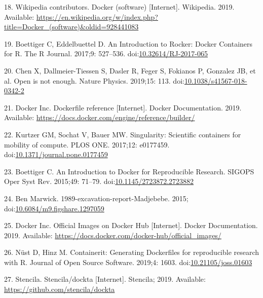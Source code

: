 \documentclass[10pt,letterpaper]{article}
\begin{document}
\leavevmode\hypertarget{ref-wikipedia_contributors_docker_2019}{}%
18. Wikipedia contributors. Docker (software) {[}Internet{]}. Wikipedia.
2019. Available:
\url{https://en.wikipedia.org/w/index.php?title=Docker_(software)\&oldid=928441083}

\leavevmode\hypertarget{ref-boettiger_introduction_2017}{}%
19. Boettiger C, Eddelbuettel D. An Introduction to Rocker: Docker
Containers for R. The R Journal. 2017;9: 527--536.
doi:\href{https://doi.org/10.32614/RJ-2017-065}{10.32614/RJ-2017-065}

\leavevmode\hypertarget{ref-chen_open_2019}{}%
20. Chen X, Dallmeier-Tiessen S, Dasler R, Feger S, Fokianos P, Gonzalez
JB, et al. Open is not enough. Nature Physics. 2019;15: 113.
doi:\href{https://doi.org/10.1038/s41567-018-0342-2}{10.1038/s41567-018-0342-2}

\leavevmode\hypertarget{ref-docker_inc_dockerfile_2019}{}%
21. Docker Inc. Dockerfile reference {[}Internet{]}. Docker
Documentation. 2019. Available:
\url{https://docs.docker.com/engine/reference/builder/}

\leavevmode\hypertarget{ref-kurtzer_singularity_2017}{}%
22. Kurtzer GM, Sochat V, Bauer MW. Singularity: Scientific containers
for mobility of compute. PLOS ONE. 2017;12: e0177459.
doi:\href{https://doi.org/10.1371/journal.pone.0177459}{10.1371/journal.pone.0177459}

\leavevmode\hypertarget{ref-boettiger_introduction_2015}{}%
23. Boettiger C. An Introduction to Docker for Reproducible Research.
SIGOPS Oper Syst Rev. 2015;49: 71--79.
doi:\href{https://doi.org/10.1145/2723872.2723882}{10.1145/2723872.2723882}

\leavevmode\hypertarget{ref-marwick_madjebebe_2015}{}%
24. Ben Marwick. 1989-excavation-report-Madjebebe. 2015;
doi:\href{https://doi.org/10.6084/m9.figshare.1297059}{10.6084/m9.figshare.1297059}

\leavevmode\hypertarget{ref-docker_inc_official_2019}{}%
25. Docker Inc. Official Images on Docker Hub {[}Internet{]}. Docker
Documentation. 2019. Available:
\url{https://docs.docker.com/docker-hub/official_images/}

\leavevmode\hypertarget{ref-nust_containerit_2019}{}%
26. Nüst D, Hinz M. Containerit: Generating Dockerfiles for reproducible
research with R. Journal of Open Source Software. 2019;4: 1603.
doi:\href{https://doi.org/10.21105/joss.01603}{10.21105/joss.01603}

\leavevmode\hypertarget{ref-stencila_dockta_2019}{}%
27. Stencila. Stencila/dockta {[}Internet{]}. Stencila; 2019. Available:
\url{https://github.com/stencila/dockta}
\end{document}
